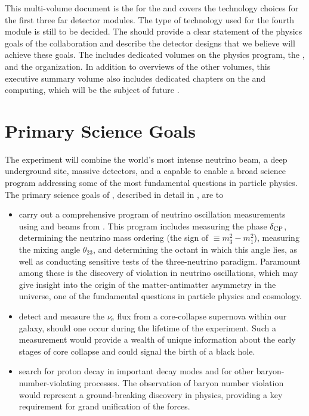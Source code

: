 This multi-volume document is the  for the   and covers the technology choices for the first three far detector modules. The type of  
technology used for the fourth module is still to be decided. The  should provide a clear statement of the physics goals of the  collaboration and describe the detector designs that we believe will achieve these goals. The  includes dedicated volumes on the  physics program, the  , and the   organization. In addition to overviews of the other volumes, this executive summary volume also includes dedicated chapters on the  and computing, which will be the subject of future .

\section{Primary Science Goals}


The  experiment will combine the world's most intense neutrino beam, a deep underground site, massive  detectors, and a capable  to enable a broad science program addressing some of the most fundamental questions in particle physics. 
The primary science goals of , described in detail in \physches{}, are to 
\begin{itemize}

\item carry out a comprehensive program of neutrino oscillation measurements using \numu and \anumu beams from . This program includes measuring the   phase $\delta_{\rm CP}$, determining the neutrino mass ordering (the sign of $ \equiv m_3^2-m_1^2$), measuring the mixing angle $\theta_{23}$, and  determining the octant in which this angle lies,
as well as conducting sensitive tests of the three-neutrino paradigm. Paramount among these is the discovery of  violation in neutrino oscillations, which may give insight into the origin of the matter-antimatter asymmetry in the universe, one of the fundamental questions in particle physics and cosmology. 

\item detect and measure the $\nu_\text{e}$ flux from a core-collapse supernova within our galaxy, should one occur during the lifetime of the  experiment. Such a measurement would provide a wealth of unique information about the early stages of core collapse and could signal the birth of a black hole.
    
\item search for proton decay in important decay modes and for other baryon-number-violating processes. The observation of baryon number violation would represent a ground-breaking discovery in physics, providing a key requirement for grand unification of the forces. 

\end{itemize}


